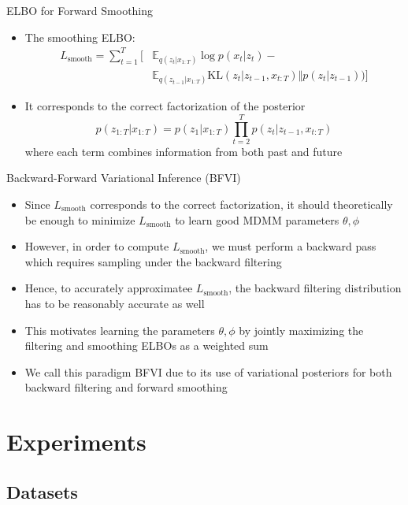 \documentclass{beamer}
\begin{document}
\begin{frame}{ELBO for Forward Smoothing}
\begin{itemize}
\item The smoothing ELBO:\[
\begin{split}
L_\text{smooth}=\sum_{t=1}^T[&\mathbb{E}_{q(z_t|x_{1:T})}\log p(x_t|z_t)-\\
&\mathbb{E}_{q(z_{t-1}|x_{1:T})}\text{KL}(z_t|z_{t-1},x_{t:T})\Vert p(z_t|z_{t-1}))]
\end{split}
\]
\item It corresponds to the correct factorization of the posterior\[
p(z_{1:T}|x_{1:T})=p(z_1|x_{1:T})\prod_{t=2}^T p(z_t|z_{t-1},x_{t:T})
\]where each term combines information from both past and future
\end{itemize}
\end{frame}

\begin{frame}{Backward-Forward Variational Inference (BFVI)}
\begin{itemize}
\item Since $L_\text{smooth}$ corresponds to the correct factorization, it should theoretically be enough to minimize $L_\text{smooth}$ to learn good MDMM parameters $\theta,\phi$
\item However, in order to compute $L_\text{smooth}$, we must perform a backward pass which requires sampling under the backward filtering
\item Hence, to accurately approximatee $L_\text{smooth}$, the backward filtering distribution has to be reasonably accurate as well
\item This motivates learning the parameters $\theta,\phi$ by jointly maximizing the filtering and smoothing ELBOs as a weighted sum
\item We call this paradigm BFVI due to its use of variational posteriors for both backward filtering and forward smoothing
\end{itemize}
\end{frame}

\section{Experiments}
\subsection{Datasets}
\end{document}
